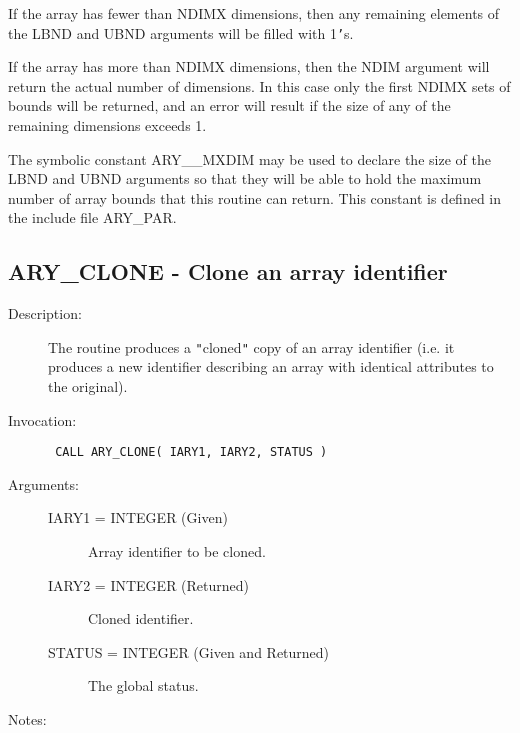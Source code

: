 \documentclass[twoside,11pt]{article}
\newcommand{\xlabel}[1]{}
\newlength{\sstbannerlength}
\newlength{\sstcaptionlength}
\newlength{\sstexampleslength}
\newlength{\sstexampleswidth}
\newcommand{\sstroutine}[3]{
   \goodbreak
   \rule{\textwidth}{0.5mm}
   \vspace{-7ex}
   \newline
   \settowidth{\sstbannerlength}{{\Large {\bf #1}}}
   \setlength{\sstcaptionlength}{\textwidth}
   \setlength{\sstexampleslength}{\textwidth}
   \addtolength{\sstbannerlength}{0.5em}
   \addtolength{\sstcaptionlength}{-2.0\sstbannerlength}
   \addtolength{\sstcaptionlength}{-5.0pt}
   \settowidth{\sstexampleswidth}{{\bf Examples:}}
   \addtolength{\sstexampleslength}{-\sstexampleswidth}
   \parbox[t]{\sstbannerlength}{\flushleft{\Large {\bf #1}}}
   \parbox[t]{\sstcaptionlength}{\center{\Large #2}}
   \parbox[t]{\sstbannerlength}{\flushright{\Large {\bf #1}}}
   \begin{description}
      #3
   \end{description}
}
\newcommand{\sstdescription}[1]{\item[Description:] #1}
\newcommand{\sstinvocation}[1]{\item[Invocation:]\hspace{0.4em}{\tt #1}}
\newcommand{\sstarguments}[1]{
   \item[Arguments:] \mbox{} \\
   \vspace{-3.5ex}
   \begin{description}
      #1
   \end{description}
}
\newcommand{\sstsubsection}[1]{ \item[{#1}] \mbox{} \\}
\newcommand{\sstnotes}[1]{\item[Notes:] \mbox{} \\[1.3ex] #1}
\newcommand{\sstitemlist}[1]{
  \mbox{} \\
  \vspace{-3.5ex}
  \begin{itemize}
     #1
  \end{itemize}
}
\newcommand{\sstitem}{\item}
\newcommand{\ssttt}{\tt}
\renewcommand{\sstroutine}[3]{
      \subsection{#1\xlabel{#1}-\label{#1}#2}
      \begin{description}
         #3
      \end{description}
   }
\renewcommand{\sstdescription}[1]{\item[Description:]
      \begin{description}
         #1
      \end{description}
   }
\renewcommand{\sstinvocation}[1]{\item[Invocation:]
      \begin{description}
         {\ssttt #1}
      \end{description}
   }
\renewcommand{\sstarguments}[1]{
      \item[Arguments:]
      \begin{description}
         #1
      \end{description}
   }
\renewcommand{\sstsubsection}[1]{\item[{#1}]}
\renewcommand{\sstnotes}[1]{\item[Notes:]
      \begin{description}
         #1
      \end{description}
   }
\newcommand{\sstitemlist}[1]{
      \begin{itemize}
         #1
      \end{itemize}
   }
\begin{document}
\begin{eqn*}
{{{         \sstitem
         If the array has fewer than NDIMX dimensions, then any
         remaining elements of the LBND and UBND arguments will be filled
         with 1{\tt '}s.

         \sstitem
         If the array has more than NDIMX dimensions, then the NDIM
         argument will return the actual number of dimensions. In this
         case only the first NDIMX sets of bounds will be returned, and an
         error will result if the size of any of the remaining dimensions
         exceeds 1.

         \sstitem
         The symbolic constant ARY\_\_MXDIM may be used to declare the
         size of the LBND and UBND arguments so that they will be able to
         hold the maximum number of array bounds that this routine can
         return. This constant is defined in the include file ARY\_PAR.
      }
   }
}
\sstroutine{
   ARY\_CLONE
}{
   Clone an array identifier
}{
   \sstdescription{
      The routine produces a {\tt "}cloned{\tt "} copy of an array identifier (i.e.
      it produces a new identifier describing an array with identical
      attributes to the original).
   }
   \sstinvocation{
      CALL ARY\_CLONE( IARY1, IARY2, STATUS )
   }
   \sstarguments{
      \sstsubsection{
         IARY1 = INTEGER (Given)
      }{
         Array identifier to be cloned.
      }
      \sstsubsection{
         IARY2 = INTEGER (Returned)
      }{
         Cloned identifier.
      }
      \sstsubsection{
         STATUS = INTEGER (Given and Returned)
      }{
         The global status.
      }
   }
   \sstnotes{
      \sstitemlist{

}}}
\end{eqn*}
\end{document}
